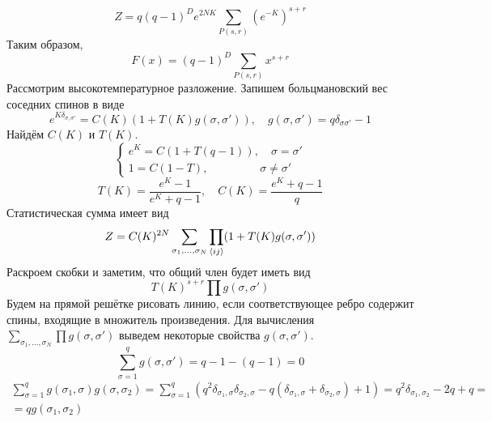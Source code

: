 \documentclass[12pt]{article}
\theoremstyle{definition}
\begin{document}
\begin{enumerate}
    \begin{equation}
        Z=q(q-1)^De^{2NK}\sum\limits_{P(s,r)}(e^{-K})^{s+r}
    \end{equation}
    Таким образом,
    \begin{equation}
        \boxed{F(x)=(q-1)^D\sum\limits_{P(s,r)}x^{s+r}}
    \end{equation}
    Рассмотрим высокотемпературное разложение. Запишем больцмановский вес соседних спинов в виде
    \begin{equation}
        e^{K\delta_{\sigma,\sigma'}}=C(K)(1+T(K)g(\sigma,\sigma')),\quad g(\sigma,\sigma')=q\delta_{\sigma\sigma'}-1
    \end{equation}
    Найдём $C(K)$ и $T(K)$.
    \begin{equation}
        \begin{cases}
            e^K=C(1+T(q-1)),\quad\sigma=\sigma'\\
            1=C(1-T),\quad\quad\quad\quad\;\;\sigma\neq\sigma'
        \end{cases}
    \end{equation}
    \begin{equation}
        T(K)=\frac{e^K-1}{e^K+q-1},\quad C(K)=\frac{e^K+q-1}{q}
    \end{equation}
    Статистическая сумма имеет вид
    \begin{equation}
        Z=C(K)^{2N}\sum\limits_{\sigma_1,...,\sigma_N}\prod\limits_{\braket{ij}}(1+T(K)g(\sigma,\sigma'))
    \end{equation}
    Раскроем скобки и заметим, что общий член будет иметь вид
    \begin{equation}
        T(K)^{s+r}\prod g(\sigma,\sigma')
    \end{equation}
    Будем на прямой решётке рисовать линию, если соответствующее ребро содержит спины, входящие в множитель произведения. Для вычисления $\sum\limits_{\sigma_1,...,\sigma_N}\prod g(\sigma,\sigma')$ выведем некоторые свойства $g(\sigma,\sigma')$.
    \begin{equation}
        \sum\limits_{\sigma=1}^qg(\sigma,\sigma')=q-1-(q-1)=0
    \end{equation}
    \begin{multline}
        \sum\limits_{\sigma=1}^qg(\sigma_1,\sigma)g(\sigma,\sigma_2)=\sum\limits_{\sigma=1}^q(q^2\delta_{\sigma_1,\sigma}\delta_{\sigma_2,\sigma}-q(\delta_{\sigma_1,\sigma}+\delta_{\sigma_2,\sigma})+1)=q^2\delta_{\sigma_1,\sigma_2}-2q+q=\\=qg(\sigma_1,\sigma_2)
    \end{multline}

\end{enumerate}
\end{document}
